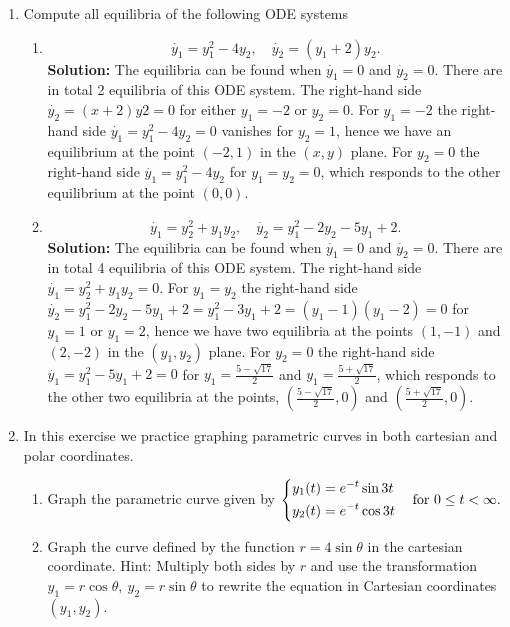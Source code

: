 \documentclass[11pt,a4paper]{article}
\begin{document}
\begin{enumerate}[\bfseries A.]
\begin{enumerate}[\bfseries 1)]
\begin{figure}[H]
			\end{figure}
		\end{enumerate}
		\item Compute all equilibria of the following ODE systems
		\begin{enumerate}[\bfseries 1)]
			\item $$
			\dot{y_1} = y_1^2 - 4y_2,\quad \dot{y_2} = (y_1+2)y_2.
			$$
			\textbf{Solution:} The equilibria can be found when $\dot{y_1} = 0$ and $\dot{y_2} = 0$. There are in total 2 equilibria of this ODE system. The right-hand side $\dot{y_2} = (x+2)y2 = 0$ for either $y_1 = −2$ or $y_2 = 0$. For $y_1 = −2$ the right-hand side $\dot{y_1} = y_1^2 - 4y_2 = 0$ vanishes for $y_2 = 1$, hence we have an equilibrium at the point $(−2, 1)$ in the $(x, y)$ plane. For $y_2 = 0$ the right-hand side $\dot{y_1} = y_1^2 - 4y_2$ for $y_1 = y_2 = 0$, which responds to the other equilibrium at the point $(0, 0)$.
			\item $$
			\dot{y_1} = y_2^2+y_1y_2,\quad \dot{y_2} = y_1^2-2y_2-5y_1+2.
			$$
			\textbf{Solution:} The equilibria can be found when $\dot{y_1} = 0$ and $\dot{y_2} = 0$. There are in total 4 equilibria of this ODE system. The right-hand side $\dot{y_1} = y_2^2+y_1y_2 = 0$. For $y_1 = y_2$ the right-hand side $\dot{y_2} = y_1^2-2y_2-5y_1+2 = y_1^2-3y_1+2 = (y_1-1)(y_1-2) = 0$ for $y_1 = 1$ or $y_1 = 2$, hence we have two equilibria at the points $(1, −1)$ and $(2, −2)$ in the $(y_1, y_2)$ plane. For $y_2 = 0$ the right-hand side $\dot{y_1} = y_1^2-5y_1 + 2 =0$ for $y_1 = \frac{5-\sqrt{17}}{2}$ and $y_1 = \frac{5+\sqrt{17}}{2}$, which responds to the other two equilibria at the points, $(\frac{5-\sqrt{17}}{2}, 0)$ and $(\frac{5+\sqrt{17}}{2}, 0)$.
		\end{enumerate}
		\item  In this exercise we practice graphing parametric curves in both cartesian and polar coordinates.
		\begin{enumerate}[\bfseries 1)]
			\item  Graph the parametric curve given by
			$
			\begin{dcases}
				y_1(t) = e^{-t}\sin 3t\\
				y_2(t) = e^{-t}\cos 3t
			\end{dcases}\quad
			\text{for $0 \leq t < \infty$}.
			$
			\item Graph the curve defined by the function $r = 4 \sin \theta$ in the cartesian coordinate. Hint: Multiply both sides by $r$ and use the transformation $y_1 = r \cos \theta,\ y_2 = r \sin \theta$ to rewrite the equation in Cartesian coordinates $(y_1, y_2)$.

\end{enumerate}
\end{enumerate}
\end{document}
